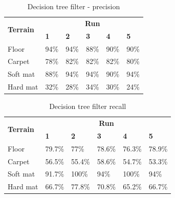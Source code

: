 \documentclass[USenglish]{ifimaster}  %
\begin{document}
\begin{table}[h]
	\centering
	\begin{tabular}{@{}llllll@{}}
		\toprule
		\multirow{2}{*}{\textbf{Terrain}} & \multicolumn{5}{c}{\textbf{Run}} \\ \cmidrule(l){2-6} 
		& \multicolumn{1}{l|}{\textbf{1}} & \multicolumn{1}{l|}{\textbf{2}} & \multicolumn{1}{l|}{\textbf{3}} & \multicolumn{1}{l|}{\textbf{4}} & \textbf{5} \\ \midrule
		\multicolumn{1}{l|}{Floor} & \multicolumn{1}{l|}{94\%} & \multicolumn{1}{l|}{94\%} & \multicolumn{1}{l|}{88\%} & \multicolumn{1}{l|}{90\%} & 90\% \\ \midrule
		\multicolumn{1}{l|}{Carpet} & \multicolumn{1}{l|}{78\%} & \multicolumn{1}{l|}{82\%} & \multicolumn{1}{l|}{82\%} & \multicolumn{1}{l|}{82\%} & 80\% \\ \midrule
		\multicolumn{1}{l|}{Soft mat} & \multicolumn{1}{l|}{88\%} & \multicolumn{1}{l|}{94\%} & \multicolumn{1}{l|}{94\%} & \multicolumn{1}{l|}{90\%} & 94\% \\ \midrule
		\multicolumn{1}{l|}{Hard mat} & \multicolumn{1}{l|}{32\%} & \multicolumn{1}{l|}{28\%} & \multicolumn{1}{l|}{34\%} & \multicolumn{1}{l|}{30\%} & 24\% \\ \bottomrule
	\end{tabular}
	\caption{Decision tree filter - precision}
	\label{dtfilterprecision}
\end{table}
\FloatBarrier

\begin{table}[h]
	\centering
	\begin{tabular}{@{}llllll@{}}
		\toprule
		\multirow{2}{*}{\textbf{Terrain}} & \multicolumn{5}{c}{\textbf{Run}} \\ \cmidrule(l){2-6} 
		& \multicolumn{1}{l|}{\textbf{1}} & \multicolumn{1}{l|}{\textbf{2}} & \multicolumn{1}{l|}{\textbf{3}} & \multicolumn{1}{l|}{\textbf{4}} & \textbf{5} \\ \midrule
		\multicolumn{1}{l|}{Floor} & \multicolumn{1}{l|}{79.7\%} & \multicolumn{1}{l|}{77\%} & \multicolumn{1}{l|}{78.6\%} & \multicolumn{1}{l|}{76.3\%} & 78.9\% \\ \midrule
		\multicolumn{1}{l|}{Carpet} & \multicolumn{1}{l|}{56.5\%} & \multicolumn{1}{l|}{55.4\%} & \multicolumn{1}{l|}{58.6\%} & \multicolumn{1}{l|}{54.7\%} & 53.3\% \\ \midrule
		\multicolumn{1}{l|}{Soft mat} & \multicolumn{1}{l|}{91.7\%} & \multicolumn{1}{l|}{100\%} & \multicolumn{1}{l|}{94\%} & \multicolumn{1}{l|}{100\%} & 94\% \\ \midrule
		\multicolumn{1}{l|}{Hard mat} & \multicolumn{1}{l|}{66.7\%} & \multicolumn{1}{l|}{77.8\%} & \multicolumn{1}{l|}{70.8\%} & \multicolumn{1}{l|}{65.2\%} & 66.7\% \\ \bottomrule
	\end{tabular}
	\caption{Decision tree filter recall}
	\label{dtfilterrecall}
\end{table}
\FloatBarrier
\end{document}
